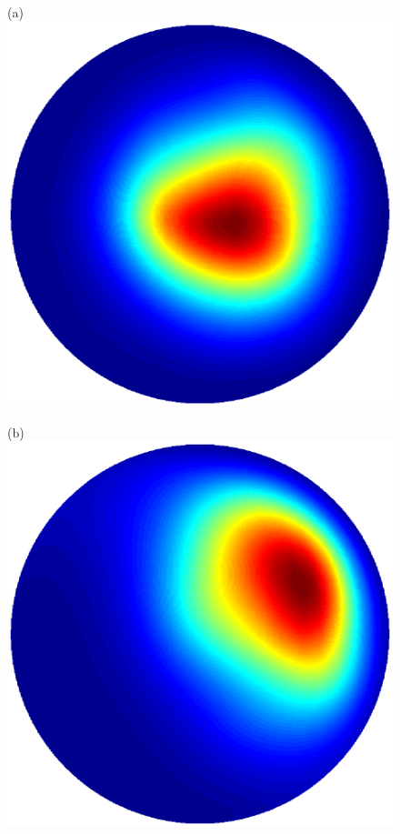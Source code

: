 \documentclass[dvips,aoas,preprint]{imsart}
\numberwithin{equation}{section}
\theoremstyle{plain}
\begin{document}
\begin{figure}[!htbp]
    \begin{minipage}[]{0.20\textwidth}
      \centering
      (a)
      \includegraphics*[width=\textwidth]{3257new.ps}
    \end{minipage}
    \begin{minipage}[]{0.20\textwidth}
      \centering
      (b)
      \includegraphics*[width=\textwidth]{3457new.ps}

\end{minipage}
\end{figure}
\end{document}
